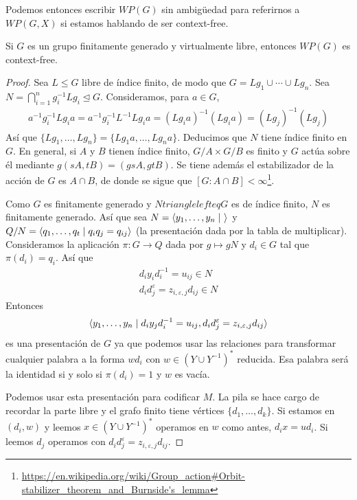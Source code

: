 \documentclass[twoside, 11pt]{article}
\begin{document}
Podemos entonces escribir $WP(G)$ sin ambigüedad para referirnos a $WP(G,X)$ si estamos hablando de ser context-free. 

\begin{lemma}
Si $G$ es un grupo finitamente generado y virtualmente libre, entonces $WP(G)$ es context-free. 
\end{lemma}
\begin{proof}
Sea $L\leq G$ libre de índice finito, de modo que $G=Lg_1\cup\cdots\cup Lg_n$. Sea $N=\bigcap_{i=1}^n g_i^{-1}Lg_i\trianglelefteq G$. Consideramos, para $a\in G$,
\begin{gather*}
a^{-1}g_i^{-1}Lg_ia=a^{-1}g_i^{-1}L^{-1}Lg_ia=(Lg_ia)^{-1}(Lg_ia)=(Lg_j)^{-1}(Lg_j)
\end{gather*}
Así que $\{Lg_1,\dots, Lg_n\}=\{Lg_1a,\dots, Lg_na\}$. Deducimos que $N$ tiene índice finito en $G$. En general, si $A$ y $B$ tienen índice finito, $G/A\times G/B$ es finito y $G$ actúa sobre él mediante $g(sA,tB)=(gsA,gtB)$. Se tiene además el estabilizador de la acción de $G$ es $A\cap B$, de donde se sigue que $[G:A\cap B]<\infty$\footnote{\url{https://en.wikipedia.org/wiki/Group_action\#Orbit-stabilizer_theorem_and_Burnside's_lemma}}.

Como $G$ es finitamente generado y $Ntrianglelefteq G$ es de índice finito, $N$ es finitamente generado. Así que sea $N=\langle{y_1,\dots, y_n\mid\ }\rangle$ y $Q/N=\langle{q_1,\dots, q_t\mid q_iq_j=q_{ij}}\rangle$ (la presentación dada por la tabla de multiplicar). Consideramos la aplicación $\pi: G\to Q$ dada por $g\mapsto gN$ y $d_i\in G$ tal que $\pi(d_i)=q_i$. Así que 
\begin{gather*}
d_iy_id_i^{-1}=u_{ij}\in N\\
d_id_j^{\varepsilon}=z_{i,\varepsilon,j}d_{ij}\in N
\end{gather*}
Entonces 
\[
\langle{y_1,\dots, y_n\mid d_iy_jd_i^{-1}=u_{ij}, d_id_j^{\varepsilon}=z_{i,\varepsilon,j}d_{ij}}\rangle
\]
es una presentación de $G$ ya que podemos usar las relaciones para transformar cualquier palabra a la forma $wd_i$ con $w\in (Y\cup Y^{-1})^*$ reducida. Esa palabra será la identidad si y solo si $\pi(d_i)=1$ y $w$ es vacía. 

Podemos usar esta presentación para codificar $M$. La pila se hace cargo de recordar la parte libre y el grafo finito tiene vértices $\{d_1,\dots, d_k\}$. Si estamos en $(d_i,w)$ y leemos $x\in (Y\cup Y^{-1})^*$ operamos en $w$ como antes, $d_ix=ud_i$. Si leemos $d_j$ operamos con $d_id_j^{\varepsilon}=z_{i,\varepsilon,j}d_{ij}$.
\end{proof}
\end{document}
